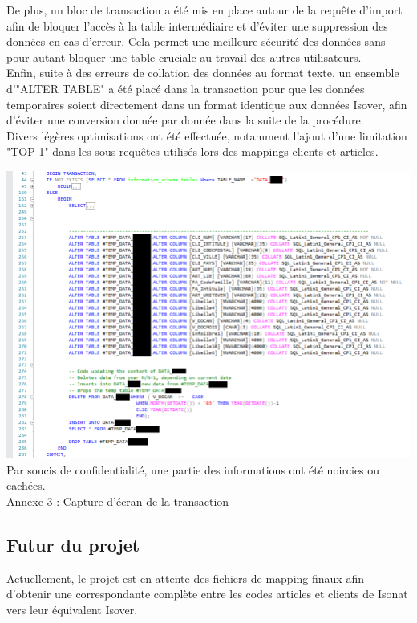 \documentclass[a4paper,12pt]{article}
\begin{document}
De plus, un bloc de transaction a été mis en place autour de la requête d'import afin de bloquer l'accès à la table intermédiaire et d'éviter une suppression des données en cas d'erreur. Cela permet une meilleure sécurité des données sans pour autant bloquer une table cruciale au travail des autres utilisateurs. \\
Enfin, suite à des erreurs de collation des données au format texte, un ensemble d'"ALTER TABLE" a été placé dans la transaction pour que les données temporaires soient directement dans un format identique aux données Isover, afin d'éviter une conversion donnée par donnée dans la suite de la procédure.\\
Divers légères optimisations ont été effectuée, notamment l'ajout d'une limitation "TOP 1" dans les sous-requêtes utilisés lors des mappings clients et articles.\\

\begin{center}
    \hspace*{-0.22\textwidth}
    \includegraphics[scale=0.75]{illustrations/screen-smss-2}
    Par soucis de confidentialité, une partie des informations ont été noircies ou cachées. \\
    
    Annexe 3 : Capture d'écran de la transaction
\end{center}


\subsection{Futur du projet}
Actuellement, le projet est en attente des fichiers de mapping finaux afin d'obtenir une correspondante complète entre les codes articles et clients de Isonat vers leur équivalent Isover.\\
\end{document}

